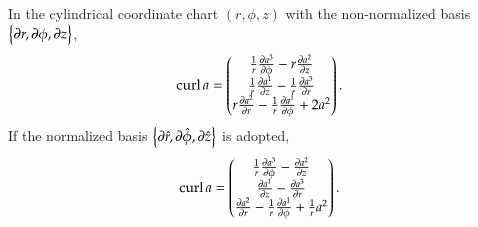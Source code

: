 \documentclass[11pt, a4paper]{book}
\begin{document}
\begin{enumerate}
  In the cylindrical coordinate chart $(r,\phi,z)$ with the non-normalized basis $\left\{
    \boldsymbol{\partial}r, \boldsymbol{\partial}\phi, \boldsymbol{\partial}z \right\}$,
  \begin{equation}
    \label{eq:curl-expr-cylindrical-coordinate-nonnormalized-basis}
    \operatorname{curl} a = \begin{pmatrix}
      \frac{1}{r}\frac{\partial a^{3}}{\partial \phi} - r \frac{\partial a^{2}}{\partial z} \\
      \frac{1}{r}\frac{\partial a^{1}}{\partial z} - \frac{1}{r}\frac{\partial a^{3}}{\partial r}
      \\
      r \frac{\partial a^{2}}{\partial r} - \frac{1}{r} \frac{\partial a^{1}}{\partial \phi} +
      2a^2
    \end{pmatrix}.
  \end{equation}
  If the normalized basis $\left\{ \boldsymbol{\partial}\hat{r}, \boldsymbol{\partial}\hat{\phi},
    \boldsymbol{\partial}\hat{z} \right\}$ is adopted,
  \begin{equation}
    \label{eq:curl-expr-cylindrical-coordinate-normalized-basis}
    \operatorname{curl} a = \begin{pmatrix}
      \frac{1}{r} \frac{\partial a^{3}}{\partial \phi} - \frac{\partial a^{2}}{\partial z} \\
      \frac{\partial a^{1}}{\partial z} - \frac{\partial a^{3}}{\partial r} \\
      \frac{\partial a^{2}}{\partial r} - \frac{1}{r} \frac{\partial a^{1}}{\partial \phi} +
      \frac{1}{r}a^2
    \end{pmatrix}.
  \end{equation}
  

\end{enumerate}
\end{document}
